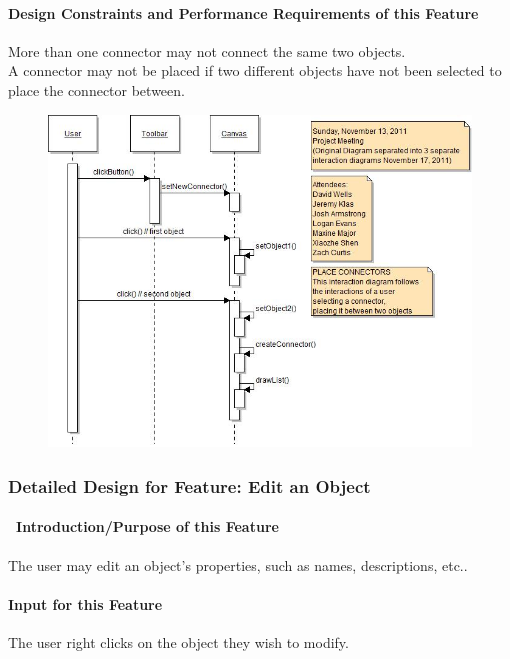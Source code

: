 \documentclass[twoside,letterpaper]{article}
\begin{document}
{\paragraph{Design Constraints and Performance Requirements of this Feature}
{\color{black}
More than one connector may not connect the same two objects.
\\A connector may not be placed if two different objects have not been selected to place the connector between.
}
\bigskip
\bigskip

\begin{figure}[h]
\centering
\includegraphics[width=5.0in]{IntNewConn.jpg}
\end{figure}

\clearpage

\subsubsection{Detailed Design for Feature: Edit an Object}

\paragraph[\ Introduction/Purpose of this Feature]
{\ Introduction/Purpose of this Feature}
{\color{black}
The user may edit an object{\textquoteright}s properties, such as names, descriptions, etc..
}

\paragraph[Input for this Feature]{Input for this Feature}
{\color{black}
The user right clicks on the object they wish to modify.
}

}
\end{document}
